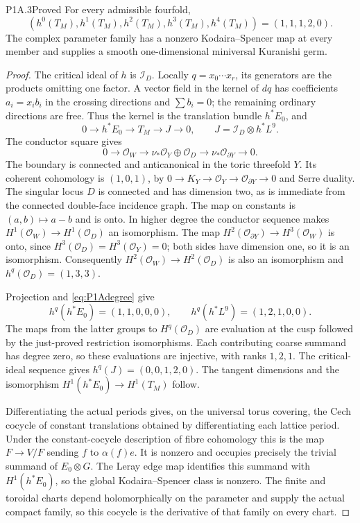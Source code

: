 \begin{statement}{P1A.3}{Proved}
For every admissible fourfold,
\[
 (h^0(T_M),h^1(T_M),h^2(T_M),h^3(T_M),h^4(T_M))
 =(1,1,1,2,0).
\]
The complex parameter family has a nonzero Kodaira--Spencer map
at every member and supplies a smooth one-dimensional miniversal
Kuranishi germ.
\end{statement}
\begin{proof}
The critical ideal of $h$ is $\mathcal I_D$. Locally
$q=x_0\cdots x_r$, its generators are the products omitting
one factor. A vector field in the kernel of $dq$ has coefficients
$a_i=x_i b_i$ in the crossing directions and
$\sum b_i=0$; the remaining ordinary directions are free.
Thus the kernel is the translation bundle $h^*E_0$, and
\[
0\to h^*E_0\to T_M\to J\to0,
\qquad J=\mathcal I_D\otimes h^*L^9.
\]
The conductor square gives
\[
0\to\mathcal O_W\to\nu_*\mathcal O_Y\oplus\mathcal O_D
 \to\nu_*\mathcal O_{\partial Y}\to0.
\]
The boundary is connected and anticanonical in the toric
threefold $Y$. Its coherent cohomology is $(1,0,1)$, by
$0\to K_Y\to\mathcal O_Y\to\mathcal O_{\partial Y}\to0$
and Serre duality. The singular locus $D$ is connected and
has dimension two, as is immediate from the connected
double-face incidence graph. The map on constants is
$(a,b)\mapsto a-b$ and is onto. In higher degree the conductor
sequence makes $H^1(\mathcal O_W)\to H^1(\mathcal O_D)$
an isomorphism. The map
$H^2(\mathcal O_{\partial Y})\to H^3(\mathcal O_W)$ is onto,
since $H^3(\mathcal O_D)=H^3(\mathcal O_Y)=0$; both sides
have dimension one, so it is an isomorphism. Consequently
$H^2(\mathcal O_W)\to H^2(\mathcal O_D)$ is also an
isomorphism and $h^q(\mathcal O_D)=(1,3,3)$.

Projection and \eqref{eq:P1Adegree} give
\[
h^q(h^*E_0)=(1,1,0,0,0),\qquad
h^q(h^*L^9)=(1,2,1,0,0).
\]
The maps from the latter groups to $H^q(\mathcal O_D)$
are evaluation at the cusp followed by the just-proved
restriction isomorphisms. Each contributing coarse summand
has degree zero, so these evaluations are injective, with
ranks $1,2,1$. The critical-ideal sequence gives
$h^q(J)=(0,0,1,2,0)$. The tangent dimensions and the
isomorphism $H^1(h^*E_0)\to H^1(T_M)$ follow.

Differentiating the actual periods gives, on the universal
torus covering, the Cech cocycle of constant translations
obtained by differentiating each lattice period. Under the
constant-cocycle description of fibre cohomology this is
the map $F\to V/F$ sending $f$ to $\alpha(f)e$.
It is nonzero and occupies precisely the trivial summand
of $E_0\otimes G$. The Leray edge map identifies this summand
with $H^1(h^*E_0)$, so the global Kodaira--Spencer class is
nonzero. The finite and toroidal charts depend holomorphically
on the parameter and supply the actual compact family,
so this cocycle is the derivative of that family on every chart.


\end{proof}
